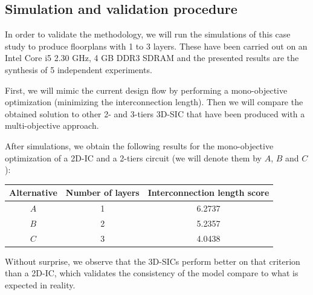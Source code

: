 \subsection{Simulation and validation procedure}
In order to validate the methodology, we will run the simulations of this case study to produce floorplans with 1 to 3 layers. These have been carried out on an Intel Core i5 2.30 GHz, 4 GB DDR3 SDRAM and the presented results are the synthesis of 5 independent experiments.

First, we will mimic the current design flow by performing a mono-objective optimization (minimizing the interconnection length). Then we will compare the obtained solution to other 2- and 3-tiers 3D-SIC that have been produced with a multi-objective approach.

After simulations, we obtain the following results for the mono-objective optimization of a 2D-IC and a 2-tiers circuit (we will denote them by $A$, $B$ and $C$):
\begin{center}
\begin{small}
\begin{tabular}{c|c|c}
Alternative & Number of layers & Interconnection length score\\
\hline
$A$ & 1 & 6.2737\\
$B$ & 2 & 5.2357\\
$C$ & 3 & 4.0438\\
\end{tabular}
\end{small}
\end{center}

Without surprise, we observe that the 3D-SICs perform better on that criterion than a 2D-IC, which validates the consistency of the model compare to what is expected in reality.

